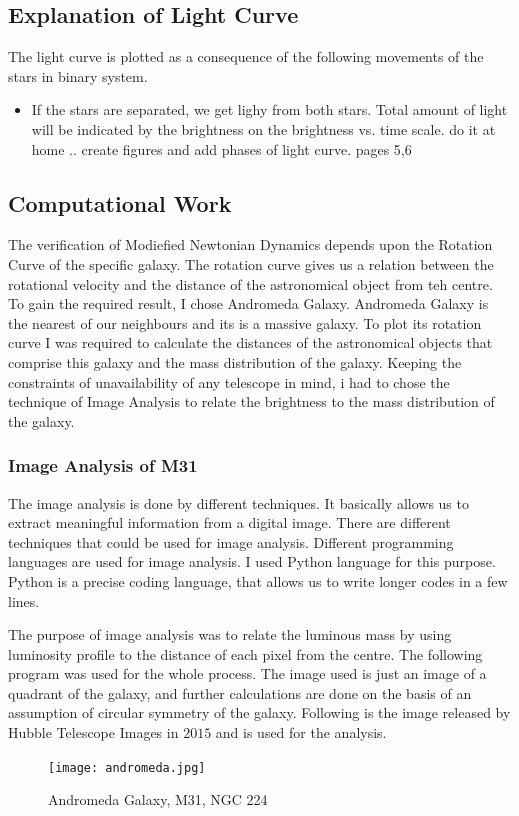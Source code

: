 \documentclass{article}
\begin{document}
\subsection*{Explanation of Light Curve}
The light curve is plotted as a consequence of the following movements of the stars in binary system.

\begin{itemize}
\item
If the stars are separated, we get lighy from both stars. Total amount of light will be indicated by the brightness on the brightness vs. time scale.
do it at home .. create figures and add phases of light curve. pages 5,6

\end{itemize}
\subsection{Computational Work}
The verification of Modiefied Newtonian Dynamics depends upon the Rotation Curve of the specific galaxy. The rotation curve gives us a relation between the rotational velocity and the distance of the astronomical object from teh centre. To gain the required result, I chose Andromeda Galaxy. Andromeda Galaxy is the nearest of our neighbours and its is a massive galaxy. To plot its rotation curve I was required to calculate the distances of the astronomical objects that comprise this galaxy and the mass distribution of the galaxy. Keeping the constraints of unavailability of any telescope in mind, i had to chose the technique of Image Analysis to relate the brightness to the mass distribution of the galaxy. 
\subsubsection{Image Analysis of M31}
The image analysis is done by different techniques. It basically allows us to extract meaningful information from a digital image. There are different techniques that could be used for image analysis. Different programming languages are used for image analysis. I used Python language for this purpose. Python is a precise coding language, that allows us to write longer codes in a few lines. 

The purpose of image analysis was to relate the luminous mass by using luminosity profile to the distance of each pixel from the centre. The following program was used for the whole process. The image used is just an image of a quadrant of the galaxy, and further calculations are done on the basis of an assumption of circular symmetry of the galaxy. Following is the image released by Hubble Telescope Images in $2015$ and is used for the analysis. 
\begin{figure}[h!]
\centering
\texttt{[image: andromeda.jpg]}
\caption{Andromeda Galaxy, M31, NGC 224}
\end{figure}
\end{document}
